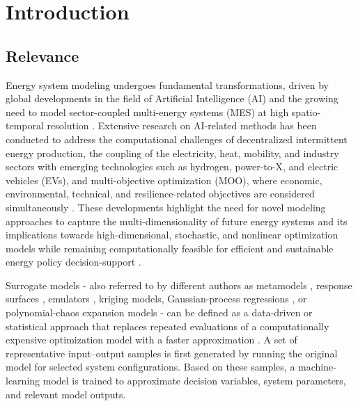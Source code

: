 \section{Introduction}
\label{sec:introduction}
\subsection{Relevance}
\label{sec:intro:relevance}

Energy system modeling undergoes fundamental transformations, driven by
global developments in the field of Artificial Intelligence (AI) and the
growing need to model sector-coupled multi-energy systems (MES) at high
spatio-temporal resolution \cite{Klemm2021,Lim2025}.
Extensive research on AI-related methods has
been conducted to address the computational challenges of decentralized
intermittent energy production, the coupling of the electricity, heat,
mobility, and industry sectors with emerging technologies such as
hydrogen, power-to-X, and electric vehicles (EVs), and multi-objective
optimization (MOO), where economic, environmental, technical, and
resilience-related objectives are considered simultaneously
\cite{Zhou20181,Zheng20231907,Ren2024,Dong2023,Yin2024}. These
developments highlight the need for novel modeling approaches to capture
the multi-dimensionality of future energy systems and its implications
towards high-dimensional, stochastic, and nonlinear optimization models
while remaining computationally feasible for efficient and sustainable
energy policy decision-support \cite{Ruan2021221,Perera2019191,Khaloie2025,Mylonopoulos202332697}.

Surrogate models - also referred to by different authors as metamodels
\cite{Roth2019214,Hirvonen2017323,Jia2022553,Xiao2018,Li2023,Wang2020202933,Starke2025214},
response surfaces
\cite{Ahmad202451,Salahinezhad2025,Xu20212696,Schulte2020,Roy2023},
emulators \cite{Hu2020,Volodina2022,Lawson201647}, kriging models,
Gaussian-process regressions
\cite{Deng2020831,Nikolaidis2021,Li2021,Perera2019191}, or
polynomial-chaos expansion models
\cite{Muhlpfordt20194806,Safta20172535,Koirala20242284,Xu20212696} -
can be defined as a data-driven or statistical approach that replaces
repeated evaluations of a computationally expensive optimization model
with a faster approximation
\cite{Perera2019191,Ruan2021221,Starke2025214,Khaloie2025,Mylonopoulos202332697,Su2022315,Thrampoulidis2021,Han2018622}.
A set of representative input--output samples is first generated by
running the original model for selected system configurations. Based on
these samples, a machine-learning model is trained to approximate
decision variables, system parameters, and relevant model outputs.


